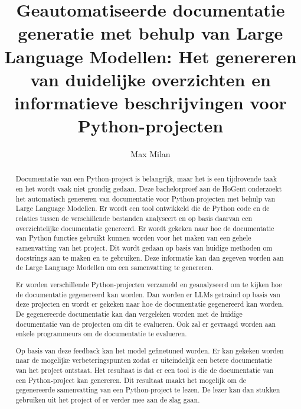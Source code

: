 \documentclass{hogent-article}
\title{Geautomatiseerde documentatie generatie met behulp van Large Language Modellen: Het genereren van duidelijke overzichten en informatieve beschrijvingen voor Python-projecten}
\author{Max Milan}
\begin{document}
\begin{abstract}
Documentatie van een Python-project is belangrijk, maar het is een tijdrovende taak en het wordt vaak niet grondig gedaan.
Deze bachelorproef aan de HoGent onderzoekt het automatisch genereren van documentatie voor Python-projecten met behulp van Large Language Modellen.
Er wordt een tool ontwikkeld die de Python code en de relaties tussen de verschillende bestanden analyseert en op basis daarvan een overzichtelijke documentatie genereerd.
Er wordt gekeken naar hoe de documentatie van Python functies gebruikt kunnen worden voor het maken van een gehele samenvatting van het project.
Dit wordt gedaan op basis van huidige methoden om docstrings aan te maken en te gebruiken.
Deze informatie kan dan gegeven worden aan de Large Language Modellen om een samenvatting te genereren.

Er worden verschillende Python-projecten verzameld en geanalyseerd om te kijken hoe de documentatie gegenereerd kan worden.
Dan worden er LLMs getraind op basis van deze projecten en wordt er gekeken naar hoe de documentatie gegenereerd kan worden.
De gegenereerde documentatie kan dan vergeleken worden met de huidige documentatie van de projecten om dit te evalueren.
Ook zal er gevraagd worden aan enkele programmeurs om de documentatie te evalueren.

Op basis van deze feedback kan het model gefinetuned worden. Er kan gekeken worden naar de mogelijke verbeteringspunten zodat er uiteindelijk een betere documentatie van het project ontstaat.
Het resultaat is dat er een tool is die de documentatie van een Python-project kan genereren.
Dit resultaat maakt het mogelijk om de gegenereerde samenvatting van een Python-project te lezen. De lezer kan dan stukken gebruiken uit het project of er verder mee aan de slag gaan.
\end{abstract}

\tableofcontents



\printbibliography[heading=bibintec]
\end{document}
